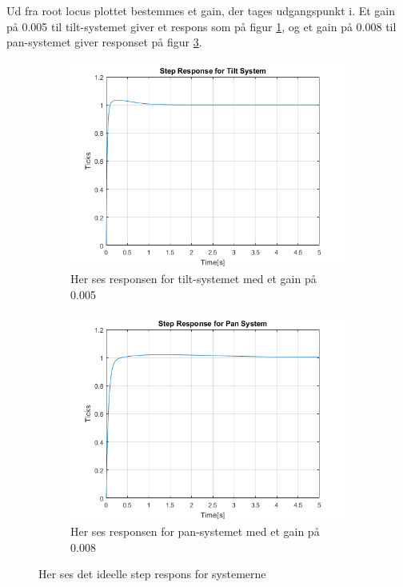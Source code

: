 Ud fra root locus plottet bestemmes et gain, der tages udgangspunkt i. Et gain på 0.005 til tilt-systemet giver et respons som på figur \ref{fig:Ideal_Response_Tilt}, og et gain på 0.008 til pan-systemet giver responset på figur \ref{fig:Ideal_Response_Pan}. 

\begin{figure}[t!]
    \centering
    \begin{subfigure}[t]{0.49\textwidth}
     \centering
        \includegraphics[width=1\textwidth]{Billeder/Ideal_Response_Tilt.png}
        \caption{Her ses responsen for tilt-systemet med et gain på 0.005}
        \label{fig:Ideal_Response_Tilt}
    \end{subfigure}
    \begin{subfigure}[t]{0.49\textwidth}
     \centering
        \includegraphics[width=1\textwidth]{Billeder/Ideal_Response_Pan.PNG}
        \caption{Her ses responsen for pan-systemet med et gain på 0.008}
        \label{fig:Ideal_Response_Pan}
    \end{subfigure}
    \caption{Her ses det ideelle step respons for systemerne}
\end{figure}

